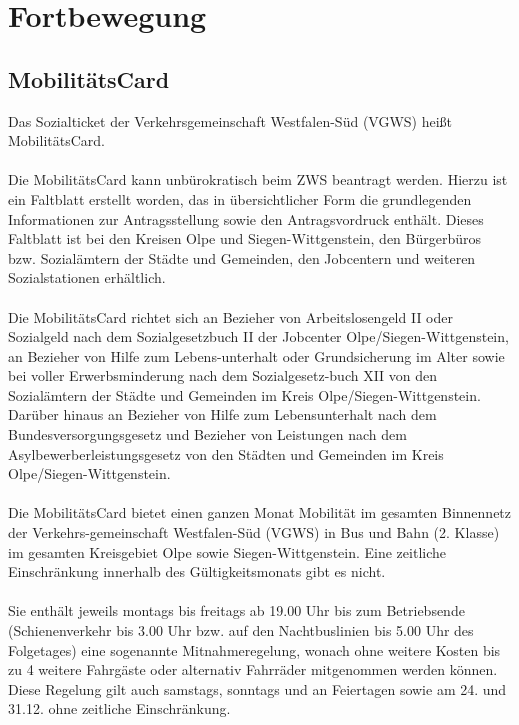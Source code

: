 \documentclass[11pt,fleqn]{book} %
\begin{document}

\chapter{Fortbewegung}

\section{MobilitätsCard}

Das Sozialticket der Verkehrsgemeinschaft Westfalen-Süd (VGWS) heißt MobilitätsCard. \\
\\
Die MobilitätsCard kann unbürokratisch beim ZWS beantragt werden. Hierzu ist ein Faltblatt erstellt worden, das in übersichtlicher Form die grundlegenden Informationen zur Antragsstellung sowie den Antragsvordruck enthält. Dieses Faltblatt ist bei den Kreisen Olpe und Siegen-Wittgenstein, den Bürgerbüros bzw. Sozialämtern der Städte und Gemeinden, den Jobcentern und weiteren Sozialstationen erhältlich.\\
\\
Die MobilitätsCard richtet sich an Bezieher von Arbeitslosengeld II oder Sozialgeld nach dem Sozialgesetzbuch II der Jobcenter Olpe/Siegen-Wittgenstein, an Bezieher von Hilfe zum Lebens-unterhalt oder Grundsicherung im Alter sowie bei voller Erwerbsminderung nach dem Sozialgesetz-buch XII von den Sozialämtern der Städte und Gemeinden im Kreis Olpe/Siegen-Wittgenstein. Darüber hinaus an Bezieher von Hilfe zum Lebensunterhalt nach dem Bundesver\-sorgungsgesetz und Bezieher von Leistungen nach dem Asylbewerberleistungsgesetz von den Städten und Gemeinden im Kreis Olpe/Siegen-Wittgenstein.\\
\\
Die MobilitätsCard bietet einen ganzen Monat Mobilität im gesamten Binnennetz der Verkehrs-gemeinschaft Westfalen-Süd (VGWS) in Bus und Bahn (2. Klasse) im gesamten Kreisgebiet Olpe sowie Siegen-Wittgenstein. Eine zeitliche Einschränkung innerhalb des Gültigkeitsmonats gibt es nicht.\\
\\
Sie enthält jeweils montags bis freitags ab 19.00 Uhr bis zum Betriebsende (Schienenverkehr bis 3.00 Uhr bzw. auf den Nachtbuslinien bis 5.00 Uhr des Folgetages) eine sogenannte Mitnahmeregelung, wonach ohne weitere Kosten bis zu 4 weitere Fahrgäste oder alternativ Fahrräder mitgenommen werden können. Diese Regelung gilt auch samstags, sonntags und an Feiertagen sowie am 24. und 31.12. ohne zeitliche Einschränkung.\\
\end{document}
